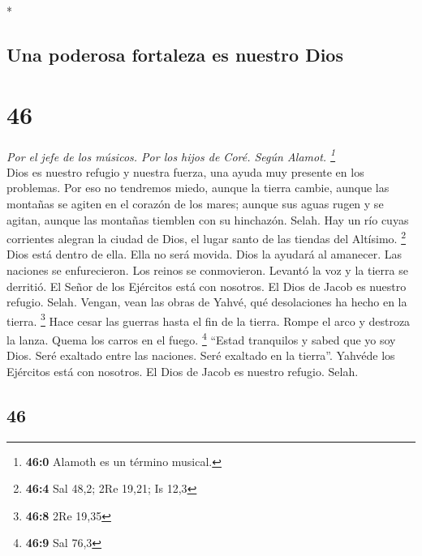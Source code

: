 \begin{paracol}{2}
\switchcolumn[0]*

\hypertarget{una-poderosa-fortaleza-es-nuestro-dios}{%
\subsection{Una poderosa fortaleza es nuestro
Dios}\label{una-poderosa-fortaleza-es-nuestro-dios}}

\hypertarget{section-90}{%
\section{46}\label{section-90}}

\emph{Por el jefe de los músicos. Por los hijos de Coré. Según Alamot.
\footnote{\textbf{46:0} Alamoth es un término musical.}}\\
 Dios es nuestro refugio y nuestra fuerza, una ayuda muy
presente en los problemas.  Por eso no tendremos miedo,
aunque la tierra cambie, aunque las montañas se agiten en el corazón de
los mares;  aunque sus aguas rugen y se agitan, aunque las
montañas tiemblen con su hinchazón. Selah.  Hay un río
cuyas corrientes alegran la ciudad de Dios, el lugar santo de las
tiendas del Altísimo. \footnote{\textbf{46:4} Sal 48,2; 2Re 19,21; Is
  12,3}  Dios está dentro de ella. Ella no será movida.
Dios la ayudará al amanecer.  Las naciones se
enfurecieron. Los reinos se conmovieron. Levantó la voz y la tierra se
derritió.  El Señor de los Ejércitos está con nosotros. El
Dios de Jacob es nuestro refugio. Selah.  Vengan, vean las
obras de Yahvé, qué desolaciones ha hecho en la tierra. \footnote{\textbf{46:8}
  2Re 19,35}  Hace cesar las guerras hasta el fin de la
tierra. Rompe el arco y destroza la lanza. Quema los carros en el fuego.
\footnote{\textbf{46:9} Sal 76,3}  ``Estad tranquilos y
sabed que yo soy Dios. Seré exaltado entre las naciones. Seré exaltado
en la tierra''.  Yahvéde los Ejércitos está con nosotros.
El Dios de Jacob es nuestro refugio. Selah.

\switchcolumn
\begin{otherlanguage}{english}

\hypertarget{section-91}{%
\section{46}\label{section-91}}


\end{otherlanguage}
\end{paracol}
